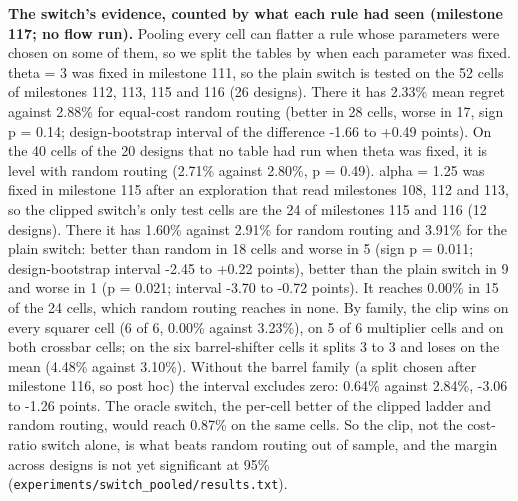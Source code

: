 \documentclass[conference]{IEEEtran}
\begin{document}
\textbf{The switch's evidence, counted by what each rule had seen
(milestone 117; no flow run).} Pooling every cell can flatter a rule
whose parameters were chosen on some of them, so we split the tables by
when each parameter was fixed. theta = 3 was fixed in milestone 111, so
the plain switch is tested on the 52 cells of milestones 112, 113, 115
and 116 (26 designs). There it has 2.33\% mean regret against 2.88\% for
equal-cost random routing (better in 28 cells, worse in 17, sign p =
0.14; design-bootstrap interval of the difference -1.66 to +0.49
points). On the 40 cells of the 20 designs that no table had run when
theta was fixed, it is level with random routing (2.71\% against 2.80\%,
p = 0.49). alpha = 1.25 was fixed in milestone 115 after an exploration
that read milestones 108, 112 and 113, so the clipped switch's only test
cells are the 24 of milestones 115 and 116 (12 designs). There it has
1.60\% against 2.91\% for random routing and 3.91\% for the plain
switch: better than random in 18 cells and worse in 5 (sign p = 0.011;
design-bootstrap interval -2.45 to +0.22 points), better than the plain
switch in 9 and worse in 1 (p = 0.021; interval -3.70 to -0.72 points).
It reaches 0.00\% in 15 of the 24 cells, which random routing reaches in
none. By family, the clip wins on every squarer cell (6 of 6, 0.00\%
against 3.23\%), on 5 of 6 multiplier cells and on both crossbar cells;
on the six barrel-shifter cells it splits 3 to 3 and loses on the mean
(4.48\% against 3.10\%). Without the barrel family (a split chosen after
milestone 116, so post hoc) the interval excludes zero: 0.64\% against
2.84\%, -3.06 to -1.26 points. The oracle switch, the per-cell better of
the clipped ladder and random routing, would reach 0.87\% on the same
cells. So the clip, not the cost-ratio switch alone, is what beats
random routing out of sample, and the margin across designs is not yet
significant at 95\% (\texttt{experiments/\allowbreak{}switch\_\allowbreak{}pooled/\allowbreak{}results.txt}).
\end{document}
